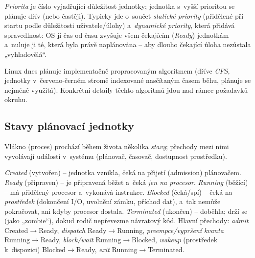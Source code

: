 \begin{definice}[Priorita]
\emph{Priorita} je číslo vyjadřující důležitost jednotky; jednotka s~vyšší prioritou se plánuje dřív (nebo častěji). Typicky jde o~součet \emph{statické priority} (přidělené při startu podle důležitosti uživatele/úlohy) a~\emph{dynamické priority}, která přidává spravedlnost: OS ji čas od času zvyšuje všem čekajícím (\emph{Ready}) jednotkám a~nuluje ji té, která byla právě naplánována -- aby dlouho čekající úloha nezůstala „vyhladovělá``.
\end{definice}

\begin{poznamka}
Linux dnes plánuje implementačně propracovaným algoritmem (dříve \emph{CFS}, jednotky v~červeno-černém stromě indexované nasčítaným časem běhu, plánuje se nejméně využitá). Konkrétní detaily těchto algoritmů jdou nad rámec požadavků okruhu.
\end{poznamka}

\subsection{Stavy plánovací jednotky}

Vlákno (proces) prochází během života několika \emph{stavy}; přechody mezi nimi vyvolávají události v~systému (plánovač, časovač, dostupnost prostředku).

\begin{definice}
\emph{Created} (vytvořen) -- jednotka vznikla, čeká na přijetí (admission) plánovačem. \emph{Ready} (připraven) -- je připravená běžet a~čeká \emph{jen na procesor}. \emph{Running} (běžící) -- má přidělený procesor a~vykonává instrukce. \emph{Blocked} (čeká/spí) -- čeká na \emph{prostředek} (dokončení I/O, uvolnění zámku, příchod dat), a~tak nemůže pokračovat, ani kdyby procesor dostala. \emph{Terminated} (ukončen) -- doběhla; drží se (jako „zombie``), dokud rodič nepřevezme návratový kód. Hlavní přechody: \emph{admit} Created$\to$Ready, \emph{dispatch} Ready$\to$Running, \emph{preempce/vypršení kvanta} Running$\to$Ready, \emph{block/wait} Running$\to$Blocked, \emph{wakeup} (prostředek k~dispozici) Blocked$\to$Ready, \emph{exit} Running$\to$Terminated.
\end{definice}

